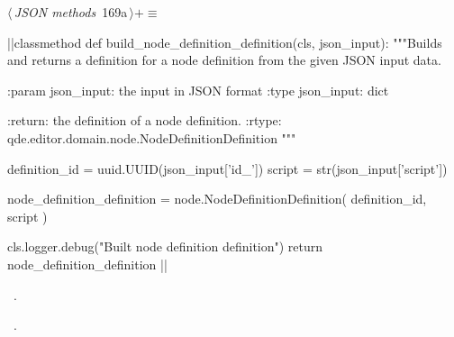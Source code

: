 \documentclass[%
    a4paper,    %
    justified,  %
    nobib,      %
    openany     %
]{tufte-book}
\begin{document}
\begin{flushleft} \small
\begin{minipage}{\linewidth}\label{scrap199}\raggedright\small
{} $\langle\,${\itshape JSON methods}\nobreak\ {\footnotesize {169a}}$\,\rangle+\equiv$
\vspace{-1ex}
\begin{pythoncode}
|\normalfont{}\fontfamily{}|classmethod
def build_node_definition_definition(cls, json_input):
    """Builds and returns a definition for a node definition from the given
    JSON input data.

    :param json_input: the input in JSON format
    :type  json_input: dict

    :return: the definition of a node definition.
    :rtype:  qde.editor.domain.node.NodeDefinitionDefinition
    """

    definition_id = uuid.UUID(json_input['id_'])
    script        = str(json_input['script'])

    node_definition_definition = node.NodeDefinitionDefinition(
        definition_id,
        script
    )

    cls.logger.debug("Built node definition definition")
    return node_definition_definition
|\NWsep|
\end{pythoncode}
\vspace{1.5ex}
\footnotesize
\begin{list}{}{\setlength{\itemsep}{-\parsep}\setlength{\itemindent}{-\leftmargin}}
\item \NWtxtMacroDefBy\ .
\item \NWtxtMacroRefIn\ .

\item{}
\end{list}
\end{minipage}\vspace{4ex}
\end{flushleft}
\end{document}

